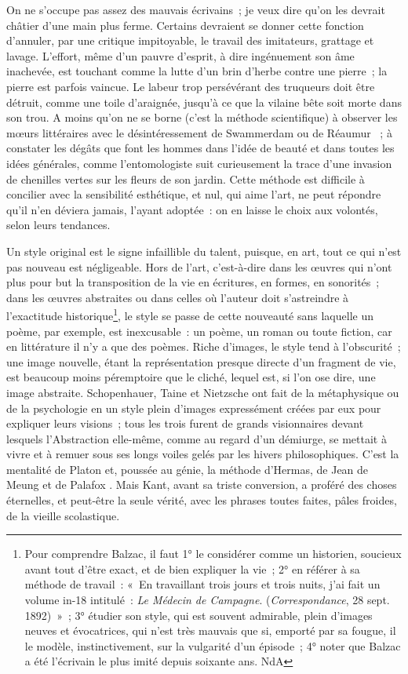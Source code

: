 \documentclass[french,twoside]{book} %
\begin{document}
On ne s’occupe pas assez des mauvais écrivains ; je veux dire qu’on les devrait châtier d’une main plus ferme. Certains devraient se donner cette fonction d’annuler, par une critique impitoyable, le travail des imitateurs, grattage et lavage. L’effort, même d’un pauvre d’esprit, à dire ingénuement son âme inachevée, est touchant comme la lutte d’un brin d’herbe contre une pierre ; la pierre est parfois vaincue. Le labeur trop persévérant des truqueurs doit être détruit, comme une toile d’araignée, jusqu’à ce que la vilaine bête soit morte dans son trou. A moins qu’on ne se borne (c’est la méthode scientifique) à observer les mœurs littéraires avec le désintéressement de Swammerdam ou de Réaumur  ; à constater les dégâts que font les hommes dans l’idée de beauté et dans toutes les idées générales, comme l’entomologiste suit curieusement la trace d’une invasion de chenilles vertes sur les fleurs de son jardin. Cette méthode est difficile à concilier avec la sensibilité esthétique, et nul, qui aime l’art, ne peut répondre qu’il n’en déviera jamais, l’ayant adoptée : on en laisse le choix aux volontés, selon leurs tendances.\par
Un style original est le signe infaillible du talent, puisque, en art, tout ce qui n’est pas nouveau est négligeable. Hors de l’art, c’est-à-dire dans les œuvres qui n’ont plus pour but la transposition de la vie en écritures, en formes, en sonorités ; dans les œuvres abstraites ou dans celles où l’auteur doit s’astreindre à l’exactitude historique\footnote{Pour comprendre Balzac, il faut 1° le considérer comme un historien, soucieux avant tout d’être exact, et de bien expliquer la vie ; 2° en référer à sa méthode de travail : « En travaillant trois jours et trois nuits, j’ai fait un volume in-18 intitulé : {\itshape Le Médecin de Campagne}. ({\itshape Correspondance}, 28 sept. 1892) » ; 3° étudier son style, qui est souvent admirable, plein d’images neuves et évocatrices, qui n’est très mauvais que si, emporté par sa fougue, il le modèle, instinctivement, sur la vulgarité d’un épisode ; 4° noter que Balzac a été l’écrivain le plus imité depuis soixante ans. NdA}, le style se passe de cette nouveauté sans laquelle un poème, par exemple, est inexcusable : un poème, un roman ou toute fiction, car en littérature il n’y a que des poèmes. Riche d’images, le style tend à l’obscurité ; une image nouvelle, étant la représentation presque directe d’un fragment de vie, est beaucoup moins péremptoire que le cliché, lequel est, si l’on ose dire, une image abstraite. Schopenhauer, Taine et Nietzsche ont fait de la métaphysique ou de la psychologie en un style plein d’images expressément créées par eux pour expliquer leurs visions ; tous les trois furent de grands visionnaires devant lesquels l’Abstraction elle-même, comme au regard d’un démiurge, se mettait à vivre et à remuer sous ses longs voiles gelés par les hivers philosophiques. C’est la mentalité de Platon et, poussée au génie, la méthode d’Hermas, de Jean de Meung et de Palafox . Mais Kant, avant sa triste conversion, a proféré des choses éternelles, et peut-être la seule vérité, avec les phrases toutes faites, pâles froides, de la vieille scolastique.\par
\end{document}
